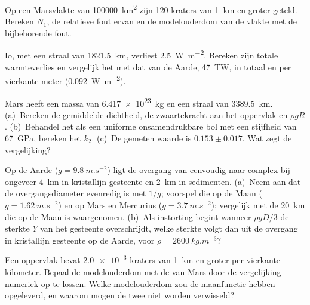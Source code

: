 \begin{exercise}[$\star$]\label{exo:b3:planetary-interiors-surfaces:3}
Op een Marsvlakte van \qty{100000}{km^2} zijn 120 kraters van \qty{1}{km} en groter
geteld. Bereken $N_1$, de relatieve fout ervan en de modelouderdom van
de vlakte met de bijbehorende fout.
\end{exercise}

\begin{exercise}[$\star$]\label{exo:b3:planetary-interiors-surfaces:4}
Io, met een straal van \qty{1821.5}{km}, verliest \qty{2.5}{W.m^{-2}}. Bereken zijn
totale warmteverlies en vergelijk het met dat van de Aarde, \qty{47}{TW}, in totaal en
per vierkante meter (\qty{0.092}{W.m^{-2}}).
\end{exercise}

\begin{exercise}[$\star\star$]\label{exo:b3:planetary-interiors-surfaces:5}
Mars heeft een massa van \qty{6.417e23}{kg} en een straal van \qty{3389.5}{km}.
(a)~Bereken de gemiddelde dichtheid, de zwaartekracht aan het oppervlak en $\rho gR$.
(b)~Behandel het als een uniforme onsamendrukbare bol met een stijfheid van
\qty{67}{GPa}, bereken het  $k_2$. (c)~De gemeten waarde is
$0.153 \pm 0.017$. Wat zegt de vergelijking?
\end{exercise}

\begin{exercise}[$\star\star$]\label{exo:b3:planetary-interiors-surfaces:6}
Op de Aarde ($g = \qty{9.8}{m.s^{-2}}$) ligt de overgang van eenvoudig naar
complex bij ongeveer \qty{4}{km} in kristallijn gesteente en \qty{2}{km} in
sedimenten. (a)~Neem aan dat de overgangsdiameter evenredig is met $1/g$;
voorspel die op de Maan ($g = \qty{1.62}{m.s^{-2}}$) en op Mars en Mercurius
($g = \qty{3.7}{m.s^{-2}}$); vergelijk met de \qty{20}{km} die op de Maan is waargenomen.
(b)~Als instorting begint wanneer $\rho gD/3$ de sterkte $Y$ van het gesteente overschrijdt,
welke sterkte volgt dan uit de overgang in kristallijn gesteente op de Aarde,
voor $\rho = \qty{2600}{kg.m^{-3}}$?
\end{exercise}

\begin{exercise}[$\star\star$]\label{exo:b3:planetary-interiors-surfaces:7}
Een oppervlak bevat $\num{2.0e-3}$ kraters van \qty{1}{km} en groter per
vierkante kilometer. Bepaal de modelouderdom met de  van Mars
door de vergelijking numeriek op te lossen. Welke modelouderdom zou de maanfunctie
hebben opgeleverd, en waarom mogen de twee niet worden verwisseld?
\end{exercise}

